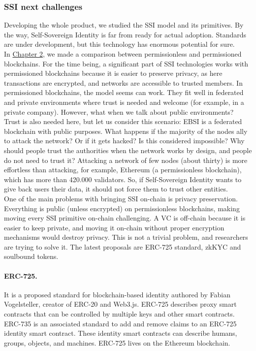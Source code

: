 \subsubsection{SSI next challenges}
Developing the whole product, we studied the SSI model and its primitives. By the way, 
Self-Sovereign Identity is far from ready for actual adoption. Standards are under 
development, but this technology has enormous potential for sure.\\
In \hyperref[subsubsec:comparison]{Chapter 2}, we made a comparison between permissionless
and permissioned blockchains. For the time being, a significant part of SSI technologies
works with permissioned blockchains because it is easier to preserve privacy, as here 
transactions are encrypted, and networks are accessible to trusted members. In 
permissioned blockchains, the model seems can work. They fit well in federated and 
private environments where trust is needed and welcome (for example, in a private company). However, what when we talk about 
public environments? Trust is also needed here, but let us consider this scenario: EBSI 
is a federated blockchain with public purposes. What happens if the majority of the nodes 
ally to attack the network? Or if it gets hacked? Is this considered impossible? Why 
should people trust the authorities when the network works by design, and people do not need
to trust it? Attacking a network of few nodes (about thirty) is more effortless than 
attacking, for example, Ethereum (a permissionless blockchain), which has more than 
420.000 validators. So, if Self-Sovereign Identity wants to give back users their data, 
it should not force them to trust other entities.\\
One of the main problems with bringing SSI on-chain is privacy preservation. Everything is public (unless encrypted) 
on permissionless blockchains, making moving every SSI primitive on-chain challenging. A 
VC is off-chain because it is easier to keep private, and moving it on-chain without proper 
encryption mechanisms would destroy privacy. This is not a trivial problem, and 
researchers are trying to solve it. The latest proposals are ERC-725 standard, zkKYC
and soulbound tokens.

\paragraph{ERC-725.} It is a proposed standard for blockchain-based identity authored by Fabian 
Vogelsteller, creator of ERC-20 and Web3.js. ERC-725 describes proxy smart contracts that 
can be controlled by multiple keys and other smart contracts. ERC-735 is an associated 
standard to add and remove claims to an ERC-725 identity smart contract. These identity 
smart contracts can describe humans, groups, objects, and machines. ERC-725 lives on the
Ethereum blockchain.

